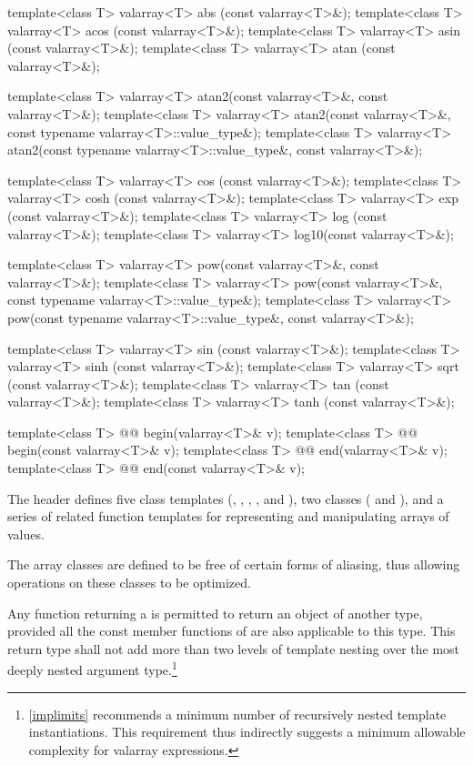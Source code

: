 \begin{codeblock}
{  template<class T> valarray<T> abs  (const valarray<T>&);
  template<class T> valarray<T> acos (const valarray<T>&);
  template<class T> valarray<T> asin (const valarray<T>&);
  template<class T> valarray<T> atan (const valarray<T>&);

  template<class T> valarray<T> atan2(const valarray<T>&, const valarray<T>&);
  template<class T> valarray<T> atan2(const valarray<T>&,
                                      const typename valarray<T>::value_type&);
  template<class T> valarray<T> atan2(const typename valarray<T>::value_type&,
                                      const valarray<T>&);

  template<class T> valarray<T> cos  (const valarray<T>&);
  template<class T> valarray<T> cosh (const valarray<T>&);
  template<class T> valarray<T> exp  (const valarray<T>&);
  template<class T> valarray<T> log  (const valarray<T>&);
  template<class T> valarray<T> log10(const valarray<T>&);

  template<class T> valarray<T> pow(const valarray<T>&, const valarray<T>&);
  template<class T> valarray<T> pow(const valarray<T>&, const typename valarray<T>::value_type&);
  template<class T> valarray<T> pow(const typename valarray<T>::value_type&, const valarray<T>&);

  template<class T> valarray<T> sin  (const valarray<T>&);
  template<class T> valarray<T> sinh (const valarray<T>&);
  template<class T> valarray<T> sqrt (const valarray<T>&);
  template<class T> valarray<T> tan  (const valarray<T>&);
  template<class T> valarray<T> tanh (const valarray<T>&);

  template<class T> @@ begin(valarray<T>& v);
  template<class T> @@ begin(const valarray<T>& v);
  template<class T> @@ end(valarray<T>& v);
  template<class T> @@ end(const valarray<T>& v);
}
\end{codeblock}

\pnum
The header  defines five class templates
(,
,
,
,
and
),
two classes (
and
),
and a series of related
function templates
for representing
and manipulating arrays of values.

\pnum
The
array classes
are defined to be free of certain forms of aliasing, thus allowing
operations on these classes to be optimized.

\pnum
Any function returning a
is permitted to return an object of another type, provided all the
const member functions of
are also applicable to this type.
This return type shall not add
more than two levels of template nesting over the most deeply nested
argument type.\footnote{\ref{implimits} recommends a minimum number
of recursively nested template
instantiations.
This requirement thus indirectly suggests a minimum
allowable complexity for valarray expressions.}

